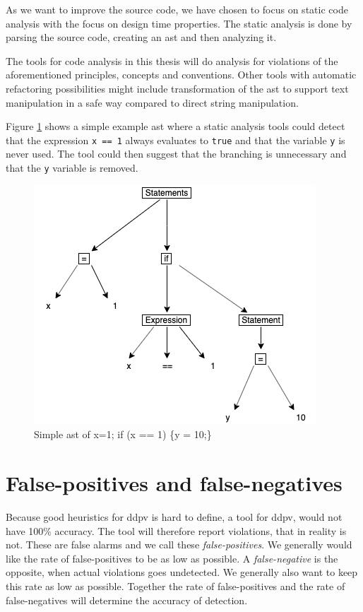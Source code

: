 \documentclass[pdftex,10pt,b5paper,twoside]{report}
\begin{document}
As we want to improve the source code, we have chosen to focus on static code analysis with the focus on design time properties. The static analysis is done by parsing the source code, creating an \gls{ast} and then analyzing it.


The tools for code analysis in this thesis will do analysis for violations of the aforementioned principles, concepts and conventions. Other tools with automatic refactoring possibilities might include transformation of the \gls{ast} to support text manipulation in a safe way compared to direct string manipulation. 




Figure \ref{fig:ast} shows a simple example \gls{ast} where a static analysis tools could detect that the expression \texttt{x == 1} always evaluates to \texttt{true} and that the variable \texttt{y} is never used. The tool could then suggest that the branching is unnecessary and that the \texttt{y} variable is removed.  

\begin{figure}[h!]
	\centering
	\includegraphics[width=\linewidth/2]{report/images/ast.png}
	\caption{Simple \gls{ast} of x=1; if (x == 1) \{y = 10;\}}
	\label{fig:ast}
\end{figure}



\section{False-positives and false-negatives}
Because good heuristics for \gls{ddpv} is hard to define, a tool for \gls{ddpv}, would not have 100\% accuracy. The tool will therefore report violations, that in reality is not. These are false alarms and we call these \textit{false-positives}. We generally would like the rate of false-positives to be as low as possible. A \textit{false-negative} is the opposite, when actual violations goes undetected. We generally also want to keep this rate as low as possible. Together the rate of false-positives and the rate of false-negatives will determine the accuracy of detection. 
\end{document}
